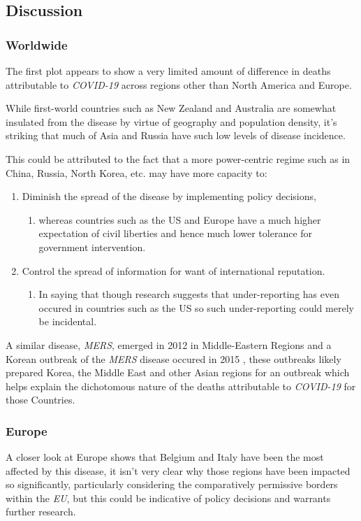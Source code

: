 \documentclass[11pt]{article}
\begin{document}
\subsection{Discussion}
\label{sec:org75a6c83}
\subsubsection{Worldwide}
\label{sec:org13220d1}
The first plot appears to show a very limited amount of difference in deaths
attributable to \emph{COVID-19} across regions other than North America and
Europe.

While first-world countries such as New Zealand and Australia are
somewhat insulated from the disease by virtue of geography and population
density, it's striking that much of Asia and Russia have such low levels of
disease incidence.

This could be attributed to the fact that a more power-centric regime such as in
China, Russia, North Korea, etc. may have more capacity to:

\begin{enumerate}
\item Diminish the spread of the disease by implementing
policy decisions,
\begin{enumerate}
\item whereas countries such as the US and Europe have a much higher expectation
of civil liberties and hence much lower tolerance for government intervention.
\end{enumerate}
\item Control the spread of information for want of international reputation.
\begin{enumerate}
\item In saying that though research suggests that under-reporting has even
occured in countries such as the US \cite{sood2020} so such under-reporting
could merely be incidental.
\end{enumerate}
\end{enumerate}

A similar disease, \emph{MERS}, emerged in 2012 in Middle-Eastern Regions
\cite{woodley2020} and a Korean outbreak of the \emph{MERS} disease occured in 2015
\cite{serrano2015}, these outbreaks likely prepared Korea, the Middle East and
other Asian regions for an outbreak which helps explain the dichotomous
nature of the deaths attributable to \emph{COVID-19} for those Countries.

\subsubsection{Europe}
\label{sec:orge45e1ab}
A closer look at Europe shows that Belgium and Italy have been the most affected
by this disease, it isn't very clear why those regions have been impacted so
significantly, particularly considering the comparatively permissive borders
within the \emph{EU}, but this could be indicative of policy decisions and warrants
further research.
\end{document}

